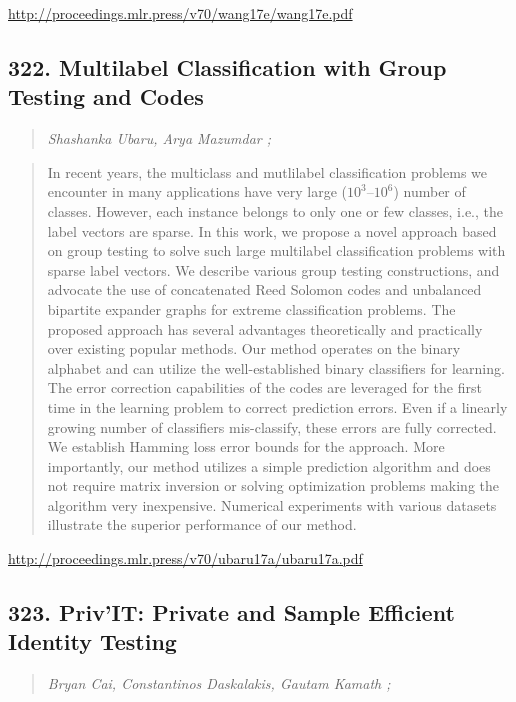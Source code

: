 \documentclass{article}
\begin{document}
\href{http://proceedings.mlr.press/v70/wang17e/wang17e.pdf}{http://proceedings.mlr.press/v70/wang17e/wang17e.pdf}

\subsection{322. Multilabel Classification with Group Testing and Codes}

\begin{quote}
\footnotesize{\textit{Shashanka Ubaru, Arya Mazumdar ;}}
\end{quote}

\begin{quote}
    In recent years, the multiclass and mutlilabel classification problems we encounter in many applications have very large ($10^3$–$10^6$) number of classes. However, each instance belongs to only one or few classes, i.e., the label vectors are sparse. In this work, we propose a novel approach based on group testing to solve such large multilabel classification problems with sparse label vectors. We describe various group testing constructions, and advocate the use of concatenated Reed Solomon codes and unbalanced bipartite expander graphs for extreme classification problems. The proposed approach has several advantages theoretically and practically over existing popular methods. Our method operates on the binary alphabet and can utilize the well-established binary classifiers for learning. The error correction capabilities of the codes are leveraged for the first time in the learning problem to correct prediction errors. Even if a linearly growing number of classifiers mis-classify, these errors are fully corrected. We establish Hamming loss error bounds for the approach. More importantly, our method utilizes a simple prediction algorithm and does not require matrix inversion or solving optimization problems making the algorithm very inexpensive. Numerical experiments with various datasets illustrate the superior performance of our method.  \end{quote}

\href{http://proceedings.mlr.press/v70/ubaru17a/ubaru17a.pdf}{http://proceedings.mlr.press/v70/ubaru17a/ubaru17a.pdf}

\subsection{323. Priv’IT: Private and Sample Efficient Identity Testing}

\begin{quote}
\footnotesize{\textit{Bryan Cai, Constantinos Daskalakis, Gautam Kamath ;}}
\end{quote}
\end{document}
